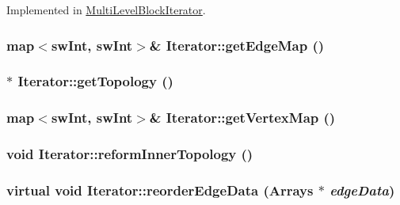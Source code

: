 Implemented in \hyperlink{classMultiLevelBlockIterator_ac43a134b15498ad6e7eec873b2f45f79}{MultiLevelBlockIterator}.\hypertarget{classIterator_ac3a2a5c322b527888c8689dd688f9aed}{
\subsubsection[{getEdgeMap}]{\setlength{\rightskip}{0pt plus 5cm}map$<${\bf swInt}, {\bf swInt}$>$\& Iterator::getEdgeMap ()}}
\label{classIterator_ac3a2a5c322b527888c8689dd688f9aed}
\hypertarget{classIterator_a1fd2f17fcb324b5f3c31c42f65185ba9}{
\subsubsection[{getTopology}]{$\ast$ Iterator::getTopology ()}}
\label{classIterator_a1fd2f17fcb324b5f3c31c42f65185ba9}
\hypertarget{classIterator_aa40b90d401685840ead9626e4ce067f0}{
\subsubsection[{getVertexMap}]{\setlength{\rightskip}{0pt plus 5cm}map$<${\bf swInt}, {\bf swInt}$>$\& Iterator::getVertexMap ()}}
\label{classIterator_aa40b90d401685840ead9626e4ce067f0}
\hypertarget{classIterator_ad08f622629417fb8913d18d95150d8de}{
\subsubsection[{reformInnerTopology}]{\setlength{\rightskip}{0pt plus 5cm}void Iterator::reformInnerTopology ()}}
\label{classIterator_ad08f622629417fb8913d18d95150d8de}
\hypertarget{classIterator_a4a803a634065aba90c6a7572542aa8c3}{
\subsubsection[{reorderEdgeData}]{\setlength{\rightskip}{0pt plus 5cm}virtual void Iterator::reorderEdgeData ({\bf Arrays} $\ast$ {\em edgeData})}}
\label{classIterator_a4a803a634065aba90c6a7572542aa8c3}


